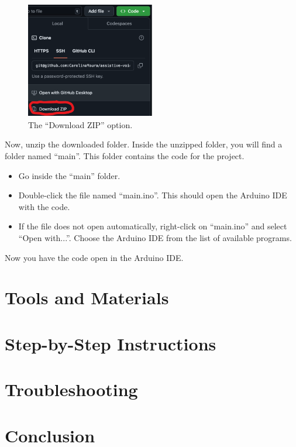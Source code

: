\documentclass{article}
\begin{document}
\begin{figure}[h]
\centering
\includegraphics[width=0.5\textwidth]{../images/download_zip.png}
\caption{The ``Download ZIP'' option.}
\end{figure}

Now, unzip the downloaded folder. Inside the unzipped folder, you will find a folder named ``main''. This folder contains the code for the project.

\begin{itemize}
    \item Go inside the ``main'' folder.
    \item Double-click the file named ``main.ino''. This should open the Arduino IDE with the code.
    \item If the file does not open automatically, right-click on ``main.ino'' and select ``Open with...''. Choose the Arduino IDE from the list of available programs.
\end{itemize}

Now you have the code open in the Arduino IDE.

\section{Tools and Materials}

\section{Step-by-Step Instructions}

\section{Troubleshooting}

\section{Conclusion}
\end{document}
